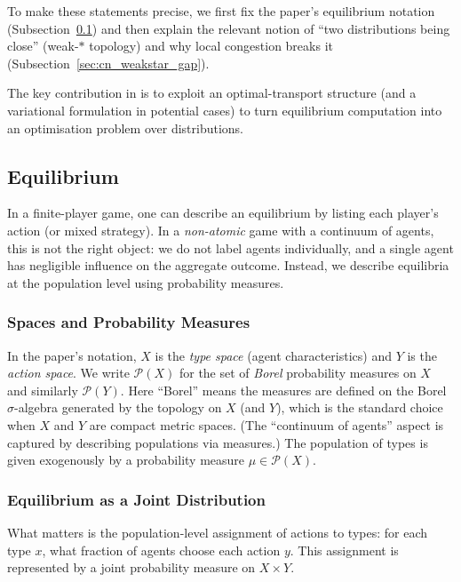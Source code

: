 To make these statements precise, we first fix the paper's equilibrium notation (Subsection~\ref{sec:cn_equilibrium}) and then explain
the relevant notion of ``two distributions being close'' (weak-$*$ topology) and why local congestion breaks it
(Subsection~\ref{sec:cn_weakstar_gap}).

The key contribution in \cite{blanchet2016optimal} is to exploit an optimal-transport structure (and a variational formulation in potential
cases) to turn equilibrium computation into an optimisation problem over distributions.



\subsection{Equilibrium}\label{sec:cn_equilibrium}
In a finite-player game, one can describe an equilibrium by listing each player's action (or mixed strategy).
In a \emph{non-atomic} game with a continuum of agents, this is not the right object: we do not label agents individually,
and a single agent has negligible influence on the aggregate outcome. Instead, we describe equilibria at the population
level using probability measures.

\subsubsection{Spaces and Probability Measures}
In the paper's notation, $X$ is the \emph{type space} (agent characteristics) and $Y$ is the \emph{action space}.
We write $\mathcal{P}(X)$ for the set of \emph{Borel} probability measures on $X$ and similarly $\mathcal{P}(Y)$.
Here ``Borel'' means the measures are defined on the Borel $\sigma$-algebra generated by the topology on $X$ (and $Y$),
which is the standard choice when $X$ and $Y$ are compact metric spaces. (The ``continuum of agents'' aspect is captured
by describing populations via measures.)
The population of types is given exogenously by a probability measure $\mu\in\mathcal{P}(X)$.

\subsubsection{Equilibrium as a Joint Distribution}
What matters is the population-level assignment of actions to types: for each type $x$, what fraction of agents choose
each action $y$. This assignment is represented by a joint probability measure on $X\times Y$.

